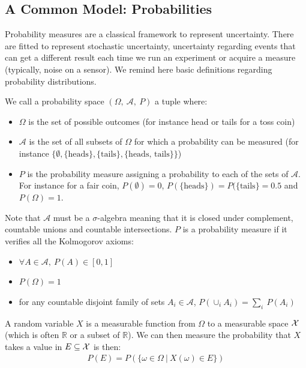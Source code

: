 \subsection{A Common Model: Probabilities}\label{sec:probabilities}
Probability measures are a classical framework to represent uncertainty. There are fitted to represent stochastic uncertainty, \ie uncertainty regarding events that can get a different result each time we run an experiment or acquire a measure (typically, noise on a sensor). We remind here basic definitions regarding probability distributions.

\begin{definition}
    We call a probability space $(\Omega,~\mathcal{A},~P)$ a tuple where:
    \begin{itemize}
        \item $\Omega$ is the set of possible outcomes (for instance head or tails for a toss coin)
        \item $\mathcal{A}$ is the set of all subsets of $\Omega$ for which a probability can be measured (for instance $\{\emptyset, \{\text{heads}\}, \{\text{tails}\}, \{\text{heads, tails}\}\}$)
        \item $P$ is the probability measure assigning a probability to each of the sets of $\mathcal{A}$. For instance for a fair coin, $P(\emptyset)=0$, $P(\{\text{heads}\})=P(\{\text{tails}\}=0.5$ and $P(\Omega)=1$.
    \end{itemize}
    Note that $\mathcal{A}$ must be a $\sigma$-algebra meaning that it is closed under complement, countable unions and countable intersections. $P$ is a probability measure if it verifies all the Kolmogorov axioms:
    \begin{itemize}
        \item $\forall A\in\mathcal{A},~P(A)\in[0,1]$
        \item $P(\Omega) = 1$
        \item for any countable disjoint family of sets $A_i\in\mathcal{A}$, $P(\cup_i A_i)=\sum_i~P(A_i)$
    \end{itemize}
\end{definition}

\begin{definition}
    A random variable $X$ is a measurable function from $\Omega$ to a measurable space ${\mathcal{X}}$ (which is often $\mathbb{R}$ or a subset of $\mathbb{R}$). We can then measure the probability that $X$ takes a value in $E\subseteq{\mathcal{X}}$ is then:
    \begin{align*}
        P(E) = P(\{\omega\in\Omega~|~X(\omega)\in E\})
    \end{align*}
\end{definition}


